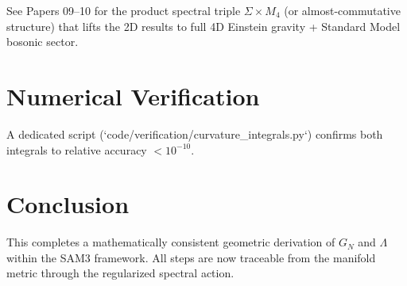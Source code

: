 \documentclass[11pt,a4paper]{article}
\begin{document}
See Papers 09--10 for the product spectral triple \( \Sigma \times M_4 \) (or almost-commutative structure) that lifts the 2D results to full 4D Einstein gravity + Standard Model bosonic sector.

\section{Numerical Verification}

A dedicated script (`code/verification/curvature_integrals.py`) confirms both integrals to relative accuracy \(< 10^{-10}\).

\section{Conclusion}
This completes a mathematically consistent geometric derivation of \(G_N\) and \(\Lambda\) within the SAM3 framework. All steps are now traceable from the manifold metric through the regularized spectral action.



\end{document}
